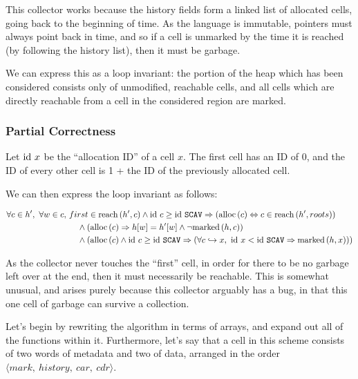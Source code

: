 This \gls{collector} works because the history fields form a linked
list of allocated \glspl{cell}, going back to the beginning of
time. As the language is immutable, \glspl{pointer} must always point
back in time, and so if a \gls{cell} is unmarked by the time it is
reached (by following the history list), then it must be
\gls{garbage}.

We can express this as a \gls{loop invariant}: the portion of the
\gls{heap} which has been considered consists only of unmodified,
reachable \glspl{cell}, and all \glspl{cell} which are directly
reachable from a \gls{cell} in the considered region are marked.

\subsubsection{Partial Correctness}
\label{sec:marksweep-example-partial}

Let $\mathrm{id}~x$ be the ``allocation ID'' of a cell $x$. The first cell has
an ID of 0, and the ID of every other cell is 1 + the ID of the
previously allocated cell.

We can then express the \gls{loop invariant} as follows:

\begin{align*}
  \forall c \in h',\ \forall w \in c,\ &first \in \mathrm{reach}\left(h', c\right) \land
  \mathrm{id}~c \geq \mathrm{id}~\mathtt{SCAV} \Rightarrow (\mathrm{alloc}\left(c\right) \Leftrightarrow c \in
  \mathrm{reach}\left(h', roots\right))\\
  &\quad\land (\mathrm{alloc}\left(c\right) \Rightarrow h[w] = h'[w] \land \lnot
  \mathrm{marked}\left(h, c\right))\\
  &\quad\land (\mathrm{alloc}\left(c\right) \land \mathrm{id}~c \geq \mathrm{id}~\mathtt{SCAV} \Rightarrow
  (\forall c \hookrightarrow x,\ \mathrm{id}~x < \mathrm{id}~\mathtt{SCAV} \Rightarrow
  \mathrm{marked}\left(h, x\right)))
\end{align*}

As the \gls{collector} never touches the ``first'' \gls{cell}, in
order for there to be no \gls{garbage} left over at the end, then it
must necessarily be reachable. This is somewhat unusual, and arises
purely because this \gls{collector} arguably has a bug, in that this
one \gls{cell} of \gls{garbage} can survive a collection.

Let's begin by rewriting the algorithm in terms of arrays, and expand
out all of the functions within it. Furthermore, let's say that a cell
in this scheme consists of two words of metadata and two of data,
arranged in the order $\langle mark,\ history,\ car,\ cdr \rangle$.

